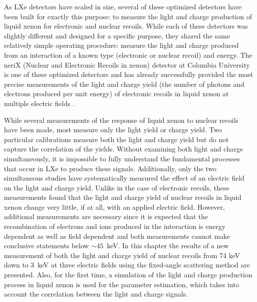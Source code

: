 As LXe detectors have scaled in size, several of these optimized detectors have been built for exactly this purpose: to measure the light and charge production of liquid xenon for electronic and nuclear recoils.  While each of these detectors was slightly different and designed for a specific purpose, they shared the same relatively simple operating procedure: measure the light and charge produced from an interaction of a known type (electronic or nuclear recoil) and energy.  The neriX (Nuclear and Electronic Recoils in xenon) detector at Columbia University is one of these optimized detectors and has already successfully provided the most precise measurements of the light and charge yield (the number of photons and electrons produced per unit energy) of electronic recoils in liquid xenon at multiple electric fields \cite{goetzke2016measurement}.  

While several measurements of the response of liquid xenon to nuclear recoils have been made, most measure only the light yield or charge yield.  Two particular calibrations \cite{aprile2006simultaneous, manzur2010scintillation} measure both the light and charge yield but do not capture the correlation of the yields.  Without examining both light and charge simultaneously, it is impossible to fully understand the fundamental processes that occur in LXe to produce these signals.  Additionally, only the two simultaneous studies \cite{aprile2006simultaneous, manzur2010scintillation} have systematically measured the effect of an electric field on the light and charge yield.  Unlike in the case of electronic recoils, these measurements found that the light and charge yield of nuclear recoils in liquid xenon change very little, if at all, with an applied electric field.  However, additional measurements are necessary since it is expected that the recombination of electrons and ions produced in the interaction is energy dependent as well as field dependent \cite{thomas1987recombination} and both measurements cannot make conclusive statements below $\sim 45$~keV.  In this chapter the results of a new measurement of both the light and charge yield of nuclear recoils from 74 keV down to 3~keV at three electric fields using the fixed-angle scattering method are presented.  Also, for the first time, a simulation of the light and charge production process in liquid xenon is used for the parameter estimation, which takes into account the correlation between the light and charge signals.


